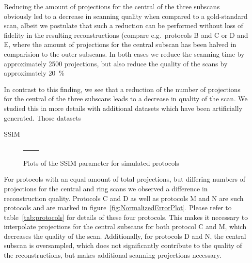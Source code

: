 Reducing the amount of projections for the central of the three subscans obviously led to a decrease in scanning quality when compared to a gold-standard scan, albeit we postulate that such a reduction can be performed without loss of fidelity in the resulting reconstructions (compare e.g.\  protocols B and C or D and E, where the amount of projections for the central subscan has been halved in comparision to the outer subscans. In both cases we reduce the scanning time by approximately 2500 projections, but also reduce the quality of the scans by approximately \SI{20}{\percent}









In contrast to this finding, we see that a reduction of the number of projections for the central of the three subscans leads to a decrease in quality of the scan. We studied this in more details with additional datasets which have been artificially generated. Those datasets  


SSIM~\cite{Wang2004}

\begin{figure}
	\centering
	\caption{Plots of the SSIM parameter for simulated protocols}
	\begin{tabular}{cc}%
		&%
		\\%
	\end{tabular}%
	\label{fig:ssimplot}
\end{figure}






For protocols with an equal amount of total projections, but differing numbers of projections for the central and ring scans we observed a difference in reconstruction quality. Protocols C and D as well as protocols M and N are such protocols and are marked in figure~\ref{fig:NormalizedErrorPlot}. Please refer to table~\ref{tab:protocols} for details of these four protocols. This makes it necessary to interpolate projections for the central subscans for both protocol C and M, which decreases the quality of the scan. Additionally, for protocols D and N, the central subscan is oversampled, which does not significantly contribute to the quality of the reconstructions, but makes additional scanning projections necessary. 

